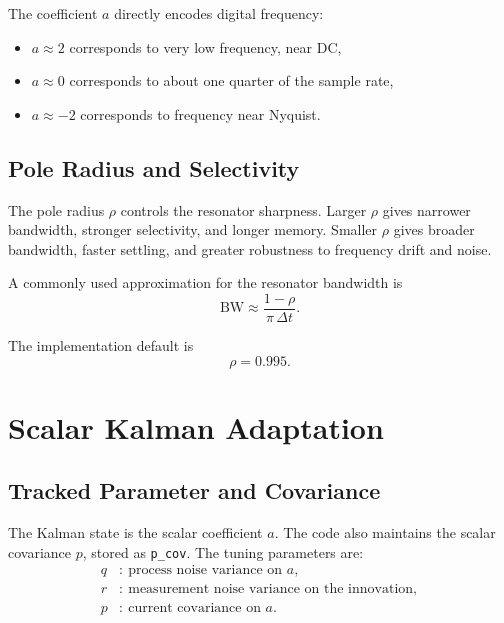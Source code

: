 \documentclass[conference]{IEEEtran}
\begin{document}
    The coefficient $a$ directly encodes digital frequency:
    \begin{itemize}[leftmargin=1.4em]
        \item $a \approx 2$ corresponds to very low frequency, near DC,
        \item $a \approx 0$ corresponds to about one quarter of the sample rate,
        \item $a \approx -2$ corresponds to frequency near Nyquist.
    \end{itemize}

    \subsection{Pole Radius and Selectivity}

    The pole radius $\rho$ controls the resonator sharpness.
    Larger $\rho$ gives narrower bandwidth, stronger selectivity, and longer
    memory. Smaller $\rho$ gives broader bandwidth, faster settling, and greater
    robustness to frequency drift and noise.

    A commonly used approximation for the resonator bandwidth is
    \begin{equation}
        \mathrm{BW} \approx \frac{1-\rho}{\pi\,\Delta t}.
    \end{equation}

    The implementation default is
    \begin{equation}
        \rho = 0.995.
    \end{equation}

    \section{Scalar Kalman Adaptation}\label{sec:kalman}

    \subsection{Tracked Parameter and Covariance}

    The Kalman state is the scalar coefficient $a$. The code also maintains the
    scalar covariance $p$, stored as \texttt{p\_cov}. The tuning parameters are:
    \begin{align}
        q &:\ \text{process noise variance on } a,\\
        r &:\ \text{measurement noise variance on the innovation},\\
        p &:\ \text{current covariance on } a.
    \end{align}
\end{document}
